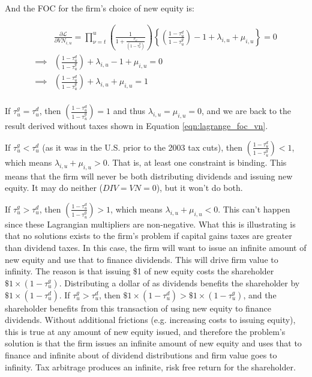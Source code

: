 \documentclass[letterpaper,12pt]{article}
\theoremstyle{definition}
\begin{document}
\begin{spacing}{1.5}
And the FOC for the firm's choice of new equity is:

\begin{equation}
\label{eqn:lagrange_foc_vn_tax}
\begin{split}
& \frac{\partial \mathcal{L}}{\partial VN_{i,u}} =   \prod_{\nu=t}^{u} \left(\frac{1}{1+\frac{r_{\nu}}{(1-\tau^{g}_{\nu})}}\right) \left\{\left(\frac{1-\tau^{d}_{u}}{1-\tau^{g}_{u}}\right) - 1 +\lambda_{i,u}  + \mu_{i,u} \right\} = 0 \\
\implies & \left(\frac{1-\tau^{d}_{u}}{1-\tau^{g}_{u}}\right) +\lambda_{i,u}- 1  + \mu_{i,u}  = 0 \\
\implies &   \left(\frac{1-\tau^{d}_{u}}{1-\tau^{g}_{u}}\right) + \lambda_{i,u} + \mu_{i,u} = 1  \\
\end{split}
\end{equation}

If $\tau^{g}_{u}=\tau^{d}_{u}$, then $ \left(\frac{1-\tau^{d}_{u}}{1-\tau^{g}_{u}}\right)=1$ and thus $\lambda_{i,u}= \mu_{i,u}=0$, and we are back to the result derived without taxes shown in Equation \ref{eqn:lagrange_foc_vn}.

If $\tau^{g}_{u}<\tau^{d}_{u}$ (as it was in the U.S. prior to the 2003 tax cuts), then $ \left(\frac{1-\tau^{d}_{u}}{1-\tau^{g}_{u}}\right)<1$, which means $ \lambda_{i,u} + \mu_{i,u} >0$.  That is, at least one constraint is binding. This means that the firm will never be both distributing dividends and issuing new equity.  It may do neither ($DIV=VN=0$), but it won't do both.  

If $\tau^{g}_{u}> \tau^{d}_{u}$, then $ \left(\frac{1-\tau^{d}_{u}}{1-\tau^{g}_{u}}\right)>1$, which means  $ \lambda_{i,u} + \mu_{i,u} <0$.  This can't happen since these Lagrangian multipliers are non-negative.  What this is illustrating is that no solutions exists to the firm's problem if capital gains taxes are greater than dividend taxes.  In this case, the firm will want to issue an infinite amount of new equity and use that to finance dividends.  This will drive firm value to infinity.  The reason is that issuing \$1 of new equity costs the shareholder $\$1\times(1-\tau^{g}_{u})$.  Distributing a dollar of as dividends benefits the shareholder by $\$1\times (1-\tau^{d}_{u})$.  If $\tau^{g}_{u}> \tau^{d}_{u}$, then $\$1\times (1-\tau^{d}_{u}) > \$1\times(1-\tau^{g}_{u})$, and the shareholder benefits from this transaction of using new equity to finance dividends.  Without additional frictions (e.g. increasing costs to issuing equity), this is true at any amount of new equity issued, and therefore the problem's solution is that the firm issues an infinite amount of new equity and uses that to finance and infinite about of dividend distributions and firm value goes to infinity.  Tax arbitrage produces an infinite, risk free return for the shareholder.


\end{spacing}
\end{document}
